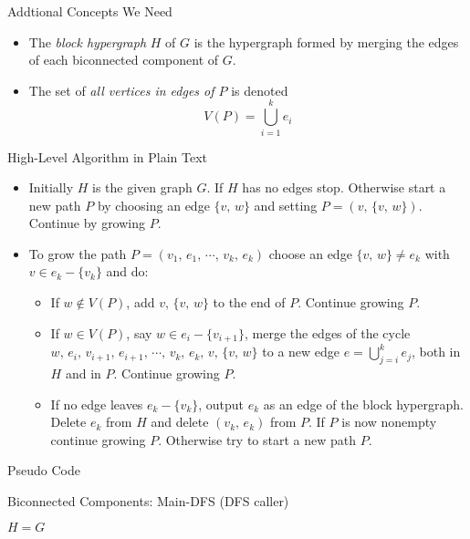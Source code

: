 \documentclass{beamer}
\begin{document}
\begin{frame}{Addtional Concepts We Need}
	\begin{itemize}
		\item
		The \emph{block hypergraph} $H$ of $G$ is the hypergraph formed by merging the edges of each biconnected component of $G$.
		\item
		The set of \emph{all vertices in edges of $P$} is denoted
		$$V(P)=\bigcup_{i=1}^ke_i$$
	\end{itemize}
\end{frame}

\begin{frame}{High-Level Algorithm in Plain Text}
	\begin{itemize}
		\item
		Initially $H$ is the given graph $G$. If $H$ has no edges stop. Otherwise start a new path $P$ by choosing an edge 
		$\{v,\,w\}$ and setting $P=(v,\,\{v,\,w\})$. Continue by growing $P$.
		\item
		To grow the path $P=(v_1,\,e_1,\,\cdots,\,v_k,\,e_k)$ choose an edge $\{v,\,w\}\neq e_k$ with $v\in e_k-\{v_k\}$ and do:
		\begin{itemize}
			\item
			If $w\notin V(P)$, add $v,\,\{v,\,w\}$ to the end of $P$. Continue growing $P$.
			\item
			If $w\in V(P)$, say $w\in e_i-\{v_{i+1}\}$, merge the edges of the cycle $w,\,e_i,\,v_{i+1},\,e_{i+1},\,\cdots,\,v_k,\,e_k,\,v,\,\{v,\,w\}$
			to a new edge $e=\bigcup_{j=i}^ke_j$, both in $H$ and in $P$. Continue growing $P$.
			\item
			If no edge leaves $e_k-\{v_k\}$, output $e_k$ as an edge of the block hypergraph. Delete $e_k$ from $H$ and delete $(v_k,\,e_k)$
			from $P$. If $P$ is now nonempty continue growing $P$. Otherwise try to start a new path $P$.
		\end{itemize}
	\end{itemize}
\end{frame}

\begin{frame}{Pseudo Code}
	\SetAlFnt{\small}
	\begin{algorithm}[H]
		\caption{Biconnected Components: Main-DFS (DFS caller)}
		$H=G$\;
	\end{algorithm}
\end{frame}
\end{document}
